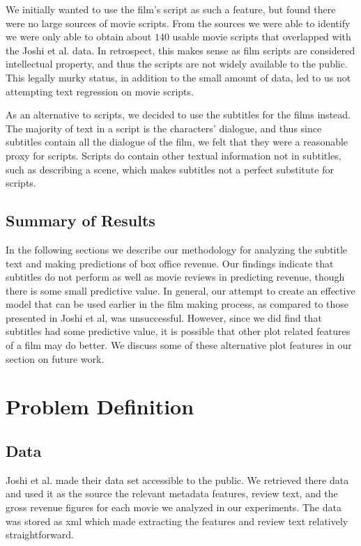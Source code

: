 \documentclass[11pt]{article}
\begin{document}
We initially wanted to use the film's script as such a feature, but found 
there were no large sources of movie scripts.
From the sources we were able to identify we were only able to
obtain about $140$ usable movie scripts that overlapped with the Joshi et al. data. 
In retrospect, this makes sense as film scripts are considered
intellectual property, and thus the scripts are not widely available to the public.
This legally murky status, in addition to the small amount of data, led to us not
attempting text regression on movie scripts.

As an alternative to scripts, we decided to use the subtitles for the films instead. The
majority of text in a script is the characters' dialogue, and thus since subtitles contain
all the dialogue of the film, we felt that they were a reasonable proxy for scripts.
Scripts do contain other textual information not in subtitles, such as describing a scene,
which makes subtitles not a perfect substitute for scripts.

\subsection{Summary of Results}
In the following sections we describe our methodology for analyzing the subtitle text
and making predictions of box office revenue. Our findings indicate that subtitles do
not perform as well as movie reviews in predicting revenue, though there is some small
predictive value. In general, our attempt to create an effective model that can be used
earlier in the film making process, as compared to those presented in Joshi et al, was 
unsuccessful. However, since we did find that subtitles had some predictive value, it 
is possible that other plot related features of a film may do better. We discuss some of
these alternative plot features in our section on future work.

\section{Problem Definition}
\subsection{Data}
Joshi et al. made their data set accessible to the public. We retrieved there data
and used it as the source the relevant metadata features, review text, and the gross revenue figures for each movie we analyzed in our experiments. The data was stored as
xml which made extracting the features and review text relatively straightforward.
\end{document}
